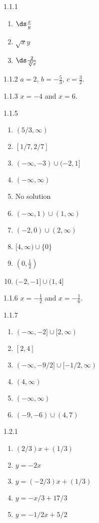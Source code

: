 \begin{Answer}{1.1.1}
\begin{enumerate}
	\item	$\ds\frac{x}{y}$
	\item	$\sqrt{x}y$
	\item	$\ds\frac{2}{\sqrt[3]{x}}$
\end{enumerate}
\end{Answer}
\begin{Answer}{1.1.2}
	$a=2$, $b=-\frac{5}{3}$, $c=\frac{3}{2}$.
\end{Answer}
\begin{Answer}{1.1.3}
$x=-4$ and $x=6$.
\end{Answer}
\begin{Answer}{1.1.5}
\begin{enumerate}
	\item	$(5/3,\infty)$
	\item	$[1/7,2/7]$
	\item	$(-\infty,-3)\cup(-2,1]$
	\item	$(-\infty,\infty)$
	\item	No solution
	\item	$(-\infty,1)\cup(1,\infty)$
	\item	$(-2,0)\cup(2,\infty)$
	\item	$[4,\infty)\cup\{0\}$
	\item	$(0,\frac{1}{2})$
	\item	$(-2,-1]\cup(1,4]$
\end{enumerate}
\end{Answer}
\begin{Answer}{1.1.6}
$x=-\frac{1}{2}$ and $x=-\frac{1}{6}$.
\end{Answer}
\begin{Answer}{1.1.7}
\begin{multicols}{2}
\begin{enumerate}
	\item	$(-\infty,-2]\cup[2,\infty)$
	\item	$[2,4]$
	\item	$(-\infty,-9/2]\cup[-1/2,\infty)$
	\item	$(4,\infty)$
	\item	$(-\infty,\infty)$
	\item	$(-9,-6)\cup(4,7)$
\end{enumerate}
\end{multicols}
\end{Answer}
\begin{Answer}{1.2.1}
\begin{enumerate}
	\item	$(2/3)x+(1/3)$
	\item	$y=-2x$
	\item	$y=(-2/3)x+(1/3)$
	\item	$y=-x/3+17/3$
	\item	$y=-1/2x+5/2$
\end{enumerate}
\end{Answer}
